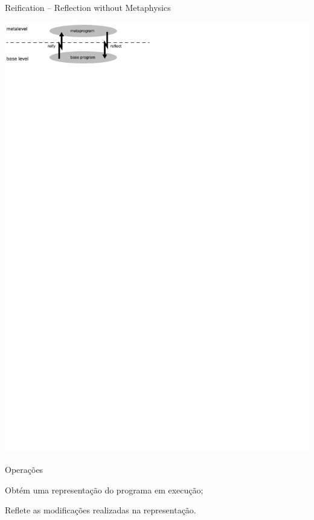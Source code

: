 \documentclass[12pt,t]{beamer}
\begin{document}
	 \begin{frame}{Reification -- Reflection without Metaphysics \cite{friedman1984reification}}
	 	\begin{block}{ }
 	 		\centering
 	 		\includegraphics[trim=0 755 310 0, clip=true]{wand.pdf}
	 	\end{block}
	 	\pause
	 	\begin{block}{Operações}
	 	\begin{description}[reificação]
	 				\item [reificação] Obtém uma representação do programa em execução;
	 				\item [reflexão] Reflete as modificações realizadas na representação.
	 			\end{description}
	 	\end{block}
	 \end{frame}	  	 
\end{document}
